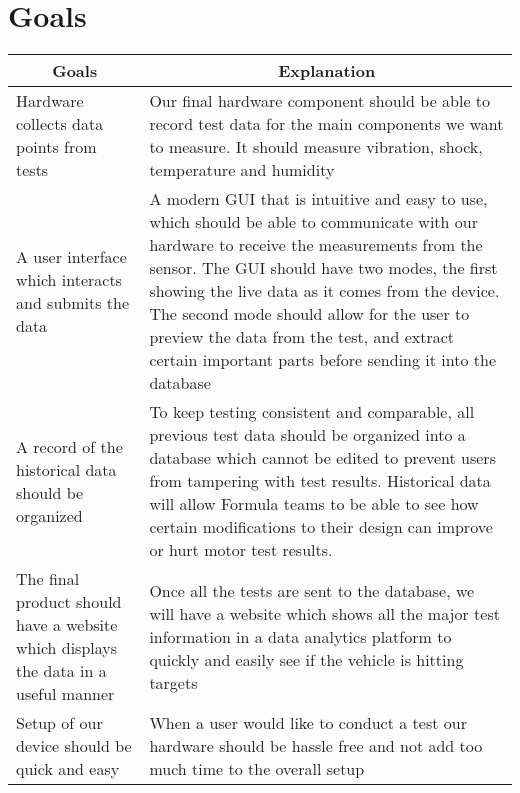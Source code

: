 \documentclass{article}
\begin{document}
\section{Goals}
    \begin{table}[H]
        \centering
        \begin{tabular}{|p{4cm}|p{8cm}|}
        \hline
        \multicolumn{1}{|c|}{\textbf{Goals}} & \multicolumn{1}{c|}{\textbf{Explanation}} 
        \\ \hline
        Hardware collects data points from tests
        & Our final hardware component should be able to record test data for the main components we want to measure. It should measure vibration, shock, temperature and humidity  
        \newline                                
        \\ \hline
        A user interface which interacts and submits the data                                 
        & A modern GUI that is intuitive and easy to use, which should be able to communicate with our hardware to receive the measurements from the sensor. The GUI should have two modes, the first showing the live data as it comes from the device. The second mode should allow for the user to preview the data from the test, and extract certain important parts before sending it into the database  
        \newline                                
        \\ \hline
        A record of the historical data should be organized                                
        & To keep testing consistent and comparable, all previous test data should be organized into a database which cannot be edited to prevent users from tampering with test results. Historical data will allow Formula teams to be able to see how certain modifications to their design can improve or hurt motor test results. 
        \newline                                
        \\ \hline
        The final product should have a website which displays the data in a useful manner                                
        & Once all the  tests are sent to the database, we will have a website which shows all the major test information in a data analytics platform to quickly and easily see if the vehicle is hitting targets  
        \newline                              
        \\ \hline
        Setup of our device should be quick and easy                               
        & When a user would like to conduct a test our hardware should be hassle free and not add too much time to the overall setup
        \newline                            
        \\ \hline
        \end{tabular}
    \end{table}
    
\end{document}
